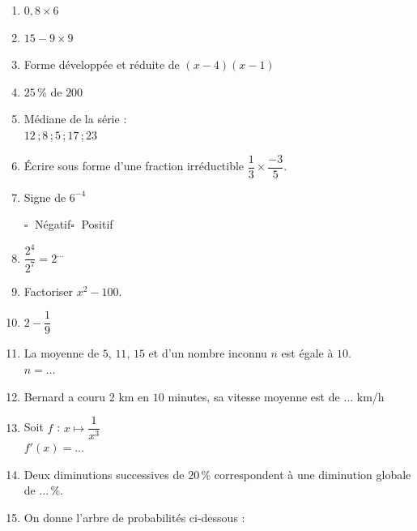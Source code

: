 \documentclass[a4paper,11pt,landscape,exos]{nsi} %
\begin{document}
\begin{multicols}{2}
\maketitle

\begin{enumerate}[itemsep=0.3cm]
    \item $0{,}8 \times 6$ 
	\item  $15-9\times9$
	\item Forme développée et réduite de $(x-4)(x-1)$
	\item $25\,\%$ de $200$
	\item Médiane de la série :\\$12$\,;\,$8$\,;\,$5$\,;\,$17$\,;\,$23$ 
	\item Écrire sous forme d'une fraction irréductible $\dfrac{1}{3}\times \dfrac{-3}{5}$.
	\item Signe de  $6^{-4}$ 
    
    	$\square\;$ Négatif\qquad $\square\;$ Positif\qquad 
	\item $\dfrac{2^{4}}{2^{7}}=2^{\ldots}$
	\item  Factoriser  $x^2-100$.
	\item $2-\dfrac{1}{9}$ 
	\item La moyenne de $5$, $11$, $15$ et d'un nombre inconnu $n$ est égale à $10$.\\$n=\ldots$
	\item Bernard a couru $2$ km en $10$ minutes, sa vitesse moyenne est de   $\ldots$ km/h
	\item Soit $f$ : $x\longmapsto \dfrac{1}{x^3}$\\$f'(x)=\ldots$
	\item Deux diminutions successives de  $20\,\%$ correspondent à une diminution globale de  $\ldots \,\%$.
    \item On donne l’arbre de probabilités ci-dessous :\\         \begin{tikzpicture}[baseline,scale = 0.5]


\end{tikzpicture}
\end{enumerate}
\end{multicols}
\end{document}

